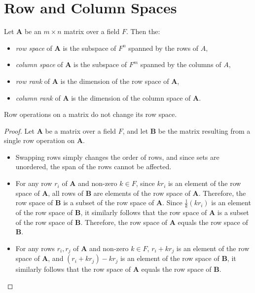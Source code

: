 \section{Row and Column Spaces}

\begin{defn}
    Let $\boldsymbol{A}$ be an $m \times n$ matrix over a field $F$. Then the:
    \begin{itemize}
        \item \emph{row space} of $\boldsymbol{A}$ is the subspace of $F^n$ spanned by the rows of $A$,
        \item \emph{column space} of $\boldsymbol{A}$ is the subspace of $F^m$ spanned by the columns of $A$,
        \item \emph{row rank} of $\boldsymbol{A}$ is the dimension of the row space of $\boldsymbol{A}$,
        \item \emph{column rank} of $\boldsymbol{A}$ is the dimension of the column space of $\boldsymbol{A}$.
    \end{itemize}
\end{defn}

\begin{lemma}\label{row-ops-row-space}
    Row operations on a matrix do not change its row space.
\end{lemma}

\begin{proof}
    Let $\boldsymbol{A}$ be a matrix over a field $F$, and let $\boldsymbol{B}$ be the matrix resulting from a single row operation on $\boldsymbol{A}$.
    \begin{itemize}
        \item Swapping rows simply changes the order of rows, and since sets are unordered, the span of the rows cannot be affected.
        \item For any row $r_i$ of $\boldsymbol{A}$ and non-zero $k \in F$, since $kr_i$ is an element of the row space of $\boldsymbol{A}$, all rows of $\boldsymbol{B}$ are elements of the row space of $\boldsymbol{A}$. Therefore, the row space of $\boldsymbol{B}$ is a subset of the row space of $\boldsymbol{A}$. Since $\frac{1}{k}(kr_i)$ is an element of the row space of $\boldsymbol{B}$, it similarly follows that the row space of $\boldsymbol{A}$ is a subset of the row space of $\boldsymbol{B}$. Therefore, the row space of $\boldsymbol{A}$ equals the row space of $\boldsymbol{B}$.
        \item For any rows $r_i, r_j$ of $\boldsymbol{A}$ and non-zero $k \in F$, $r_i + kr_j$ is an element of the row space of $\boldsymbol{A}$, and $(r_i + kr_j) - kr_j$ is an element of the row space of $\boldsymbol{B}$, it similarly follows that the row space of $\boldsymbol{A}$ equals the row space of $\boldsymbol{B}$.
    \end{itemize}
\end{proof}

